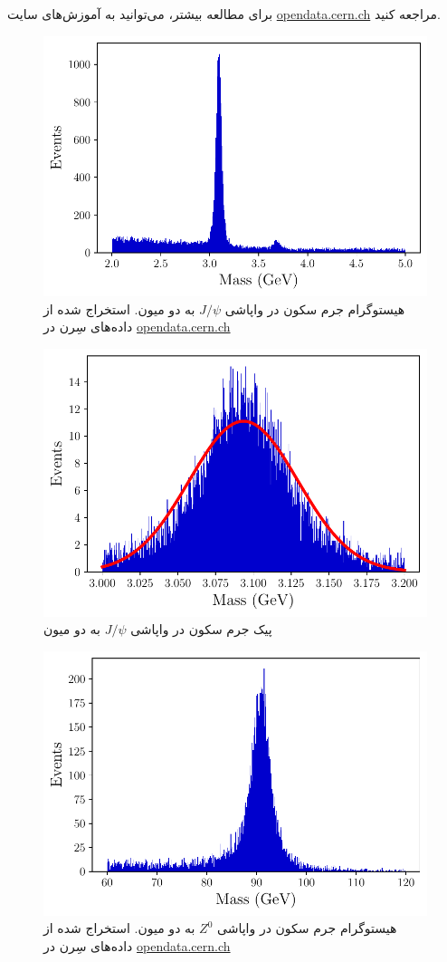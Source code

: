 \documentclass[12pt,a4paper]{article}
\begin{document}
	برای مطالعه بیشتر، می‌توانید به آموزش‌های سایت \url{opendata.cern.ch} مراجعه کنید.

	\begin{figure}[h]
		\centering
		\includegraphics[width=0.85\linewidth]{calculations/jpsi_full_mass_hist.pdf}
		\caption{هیستوگرام جرم سکون در واپاشی $J/\psi$ به دو میون. استخراج شده از داده‌های سِرن در \url{opendata.cern.ch}}
		\label{fig:jpsi_hist_full}
	\end{figure}
	\begin{figure}[h]
		\centering
		\includegraphics[width=0.85\linewidth]{calculations/jpsi_peak_mass_hist.pdf}
		\caption{پیک جرم سکون در واپاشی $J/\psi$ به دو میون}
	\end{figure}
	\begin{figure}[h]
		\centering
		\includegraphics[width=0.9\linewidth]{calculations/z0_full_mass_hist.pdf}
		\caption{هیستوگرام جرم سکون در واپاشی $Z^0$ به دو میون. استخراج شده از داده‌های سِرن در \url{opendata.cern.ch}}
		\label{fig:z0_hist_full}
	\end{figure}
\end{document}
